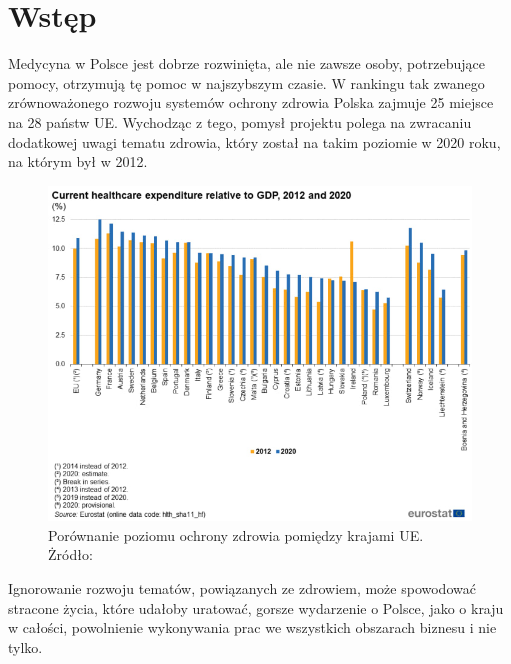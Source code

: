 ﻿\chapter*{Wstęp}

Medycyna w Polsce jest dobrze rozwinięta, ale nie zawsze osoby, potrzebujące pomocy, otrzymują tę pomoc w najszybszym czasie. W rankingu tak zwanego zrównoważonego rozwoju systemów ochrony zdrowia Polska zajmuje 25 miejsce na 28 państw UE. Wychodząc z tego, pomysł projektu polega na zwracaniu dodatkowej uwagi tematu zdrowia, który został na takim poziomie w 2020 roku, na którym był w 2012.

\begin{figure}[!ht]
	\centering
		\includegraphics[width=16cm]{polska_med.jpg}
	\caption{\footnotesize Porównanie poziomu ochrony zdrowia pomiędzy krajami UE. Żródło: \cite{www-1}}
	\label{fig:plotend}
\end{figure}

Ignorowanie rozwoju tematów, powiązanych ze zdrowiem, może spowodować stracone życia, które udałoby uratować, gorsze wydarzenie o Polsce, jako o kraju w całości, powolnienie wykonywania prac we wszystkich obszarach biznesu i nie tylko.
